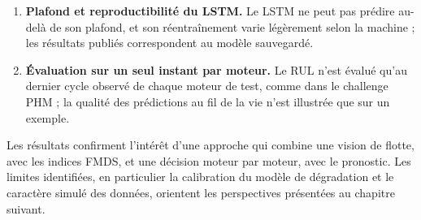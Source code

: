 \begin{enumerate}
\item \textbf{Plafond et reproductibilité du LSTM.} Le LSTM ne peut pas prédire au-delà de son plafond, et son réentraînement varie légèrement selon la machine ; les résultats publiés correspondent au modèle sauvegardé.
\item \textbf{Évaluation sur un seul instant par moteur.} Le RUL n'est évalué qu'au dernier cycle observé de chaque moteur de test, comme dans le challenge PHM ; la qualité des prédictions au fil de la vie n'est illustrée que sur un exemple.
\end{enumerate}

\chapconclusion

Les résultats confirment l'intérêt d'une approche qui combine une vision de flotte, avec les indices FMDS, et une décision moteur par moteur, avec le pronostic. Les limites identifiées, en particulier la calibration du modèle de dégradation et le caractère simulé des données, orientent les perspectives présentées au chapitre suivant.
